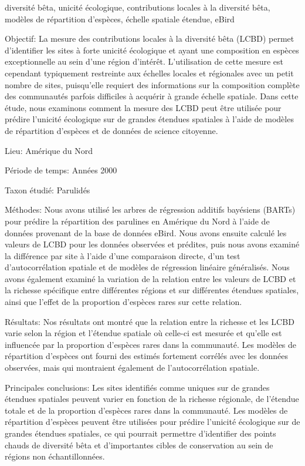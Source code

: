 \begin{resume}{diversité bêta, unicité écologique, contributions locales à la diversité bêta, modèles de répartition d'espèces, échelle spatiale étendue, eBird}
  
  Objectif: La mesure des contributions locales à la diversité bêta (LCBD) permet d'identifier les sites à forte unicité écologique et ayant une composition en espèces exceptionnelle au sein d'une région d'intérêt. L'utilisation de cette mesure est cependant typiquement restreinte aux échelles locales et régionales avec un petit nombre de sites, puisqu'elle requiert des informations sur la composition complète des communautés parfois difficiles à acquérir à grande échelle spatiale. Dans cette étude, nous examinons comment la mesure des LCBD peut être utilisée pour prédire l'unicité écologique sur de grandes étendues spatiales à l'aide de modèles de répartition d'espèces et de données de science citoyenne.

  Lieu: Amérique du Nord
  
  Période de temps: Années 2000
  
  Taxon étudié: Parulidés
  
  Méthodes: Nous avons utilisé les arbres de régression additifs bayésiens (BARTs) pour prédire la répartition des parulines en Amérique du Nord à l'aide de données provenant de la base de données eBird. Nous avons ensuite calculé les valeurs de LCBD pour les données observées et prédites, puis nous avons examiné la différence par site à l'aide d'une comparaison directe, d'un test d'autocorrélation spatiale et de modèles de régression linéaire généralisés. Nous avons également examiné la variation de la relation entre les valeurs de LCBD et la richesse spécifique entre différentes régions et sur différentes étendues spatiales, ainsi que l'effet de la proportion d'espèces rares sur cette relation.
  
  Résultats: Nos résultats ont montré que la relation entre la richesse et les LCBD varie selon la région et l'étendue spatiale où celle-ci est mesurée et qu'elle est influencée par la proportion d'espèces rares dans la communauté. Les modèles de répartition d'espèces ont fourni des estimés fortement corrélés avec les données observées, mais qui montraient également de l'autocorrélation spatiale.
  
  Principales conclusions: Les sites identifiés comme uniques sur de grandes étendues spatiales peuvent varier en fonction de la richesse régionale, de l'étendue totale et de la proportion d'espèces rares dans la communauté. Les modèles de répartition d'espèces peuvent être utilisées pour prédire l'unicité écologique sur de grandes étendues spatiales, ce qui pourrait permettre d'identifier des points chauds de diversité bêta et d'importantes cibles de conservation au sein de régions non échantillonnées.

\end{resume}

